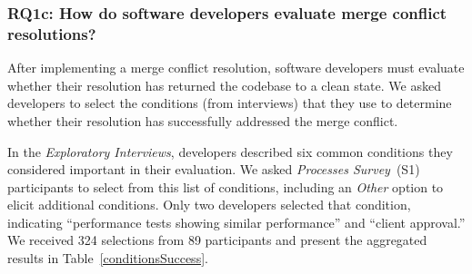 \subsubsection{\textbf{RQ1c}: How do software developers \textbf{evaluate} merge conflict resolutions?}\label{RQ1c}

After implementing a merge conflict resolution, software developers must evaluate whether their resolution has returned the codebase to a clean state.
We asked developers to select the conditions (from interviews) that they use to determine whether their resolution has successfully addressed the merge conflict.


In the \textit{Exploratory Interviews}, developers described six common conditions they considered important in their evaluation.
We asked \textit{Processes Survey}~(S1) participants to select from this list of conditions, including an \textit{Other} option to elicit additional conditions.
Only two developers selected that condition, indicating ``performance tests showing similar performance'' and ``client approval.''
We received 324 selections from 89 participants and present the aggregated results in Table~\ref{conditionsSuccess}.

